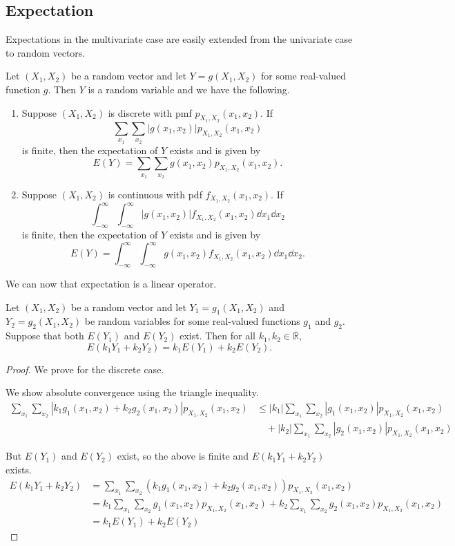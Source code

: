 \subsection{Expectation}

Expectations in the multivariate case are easily extended from the univariate case to random vectors.

\begin{theorem}
	Let $(X_1,X_2)$ be a random vector and let $Y=g(X_1,X_2)$ for some real-valued function $g$. Then $Y$ is a random variable and we have the following.
	\begin{enumerate}[label=\color{main}(\alph*)]
		\item Suppose $(X_1,X_2)$ is discrete with pmf $p_{X_1,X_2}(x_1,x_2)$. If $$\sum_{x_1}\sum_{x_2}|g(x_1,x_2)|p_{X_1,X_2}(x_1,x_2)$$ is finite, then the expectation of $Y$ exists and is given by $$E(Y)=\sum_{x_1}\sum_{x_2}g(x_1,x_2)p_{X_1,X_2}(x_1,x_2).$$
		\item Suppose $(X_1,X_2)$ is continuous with pdf $f_{X_1,X_2}(x_1,x_2)$. If $$\int_{-\infty}^{\infty}\int_{-\infty}^{\infty}|g(x_1,x_2)|f_{X_1,X_2}(x_1,x_2)\dd{x_1}\dd{x_2}$$ is finite, then the expectation of $Y$ exists and is given by $$E(Y)=\int_{-\infty}^{\infty}\int_{-\infty}^{\infty}g(x_1,x_2)f_{X_1,X_2}(x_1,x_2)\dd{x_1}\dd{x_2}.$$
	\end{enumerate}
\end{theorem}

We can now that expectation is a linear operator.

\begin{theorem}
	Let $(X_1,X_2)$ be a random vector and let $Y_1=g_1(X_1,X_2)$ and $Y_2=g_2(X_1,X_2)$ be random variables for some real-valued functions $g_1$ and $g_2$. Suppose that both $E(Y_1)$ and $E(Y_2)$ exist. Then for all $k_1,k_2\in\mathbb R$,
	$$E(k_1Y_1+k_2Y_2)=k_1E(Y_1)+k_2E(Y_2).$$
\end{theorem}

\begin{proof}
	We prove for the discrete case.

	We show absolute convergence using the triangle inequality.
	\begin{align*}
		\sum_{x_1}\sum_{x_2}|k_1g_1(x_1,x_2)+k_2g_2(x_1,x_2)|p_{X_1,X_2}(x_1,x_2)&\leq |k_1|\sum_{x_1}\sum_{x_2}|g_1(x_1,x_2)|p_{X_1,X_2}(x_1,x_2)\\
		&\quad+|k_2|\sum_{x_1}\sum_{x_2}|g_2(x_1,x_2)|p_{X_1,X_2}(x_1,x_2)
	\end{align*}

	But $E(Y_1)$ and $E(Y_2)$ exist, so the above is finite and $E(k_1Y_1+k_2Y_2)$ exists.
	\begin{align*}
		E(k_1Y_1+k_2Y_2)&=\sum_{x_1}\sum_{x_2}(k_1g_1(x_1,x_2)+k_2g_2(x_1,x_2))p_{X_1,X_2}(x_1,x_2)\\
		&=k_1\sum_{x_1}\sum_{x_2}g_1(x_1,x_2)p_{X_1,X_2}(x_1,x_2)+k_2\sum_{x_1}\sum_{x_2}g_2(x_1,x_2)p_{X_1,X_2}(x_1,x_2)\\
		&=k_1E(Y_1)+k_2E(Y_2)
	\end{align*}
\end{proof}
